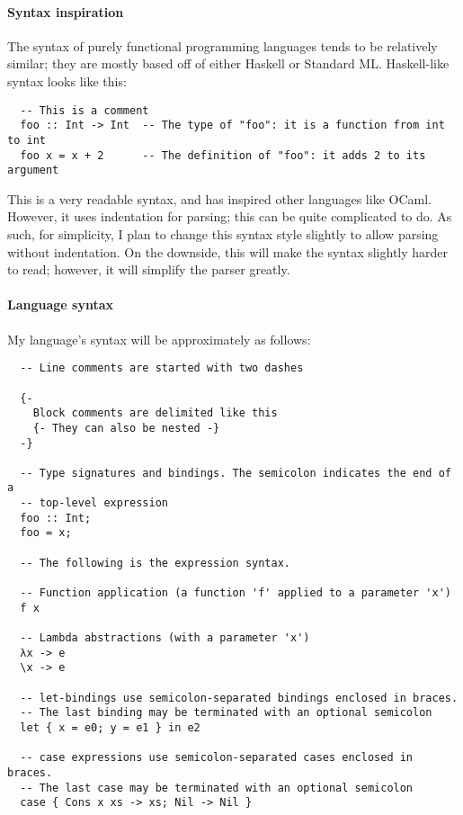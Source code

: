 \documentclass[9pt]{extarticle}
\begin{document}
\paragraph{Syntax inspiration}

The syntax of purely functional programming languages tends to be relatively
similar; they are mostly based off of either Haskell or Standard ML.
Haskell-like syntax looks like this:

\begin{verbatim}
  -- This is a comment
  foo :: Int -> Int  -- The type of "foo": it is a function from int to int
  foo x = x + 2      -- The definition of "foo": it adds 2 to its argument
\end{verbatim}

This is a very readable syntax, and has inspired other languages like OCaml.
However, it uses indentation for parsing; this can be quite complicated to do.
As such, for simplicity, I plan to change this syntax style slightly to allow
parsing without indentation. On the downside, this will make the syntax slightly
harder to read; however, it will simplify the parser greatly.

\paragraph{Language syntax}

My language's syntax will be approximately as follows:

\begin{verbatim}
  -- Line comments are started with two dashes

  {-
    Block comments are delimited like this
    {- They can also be nested -}
  -}

  -- Type signatures and bindings. The semicolon indicates the end of a
  -- top-level expression
  foo :: Int;
  foo = x;

  -- The following is the expression syntax.

  -- Function application (a function 'f' applied to a parameter 'x')
  f x

  -- Lambda abstractions (with a parameter 'x')
  λx -> e
  \x -> e

  -- let-bindings use semicolon-separated bindings enclosed in braces.
  -- The last binding may be terminated with an optional semicolon
  let { x = e0; y = e1 } in e2

  -- case expressions use semicolon-separated cases enclosed in braces.
  -- The last case may be terminated with an optional semicolon
  case { Cons x xs -> xs; Nil -> Nil }
\end{verbatim}
\end{document}
